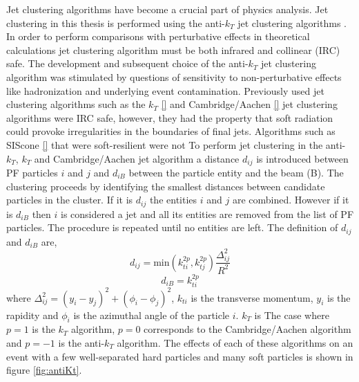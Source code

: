 Jet clustering algorithms have become a crucial part of physics analysis.
Jet clustering in this thesis is performed using 
the anti-$k_{T}$ jet clustering algorithms \cite{Cacciari:2008gp}.
In order to perform %
comparisons with perturbative effects in theoretical calculations jet clustering algorithm
must be both infrared and collinear (IRC) safe. %
The development and subsequent choice of the anti-$k_{T}$ jet clustering algorithm
was stimulated by questions of sensitivity to non-perturbative effects like hadronization
and underlying event contamination. Previously used jet clustering algorithms
such as the $k_{T}$ \ref{} %
and Cambridge/Aachen \ref{} %
jet clustering algorithms were IRC safe, however, they
had the property that soft radiation could provoke irregularities in the boundaries
of final jets. 
Algorithms such as SIScone \ref{} %
that were soft-resilient were not %
To perform jet clustering in the anti-$k_{T}$, $k_{T}$ and Cambridge/Aachen jet algorithm
a distance $d_{ij}$ is introduced between PF particles $i$ and $j$ and $d_{iB}$ between
the particle entity and the beam (B). The clustering proceeds by identifying the smallest distances
between candidate particles in the cluster.
If it is $d_{ij}$ the entities $i$ and $j$ are combined. However if it is $d_{iB}$ then $i$ 
is considered a jet and all its entities are removed from the list of PF particles. The procedure
is repeated until no entities are left. The definition of $d_{ij}$ and $d_{iB}$ are,
\begin{equation}
d_{ij}=\mathrm{min}(k_{ti}^{2p},k_{tj}^{2p})\frac{\Delta^{2}_{ij}}{R^{2}}
\end{equation}
\begin{equation}
d_{iB}=k_{ti}^{2p}
\end{equation}
where $\Delta_{ij}^{2}=(y_{i}-y_{j})^{2}+(\phi_{i}-\phi_{j})^{2}$, $k_{ti}$ is the 
transverse momentum, $y_{i}$ is the rapidity and $\phi_{i}$ is the azimuthal angle of 
the particle $i$. 
$k_{T}$ is %
The case where $p=1$ is the $k_{T}$ algorithm, $p=0$ corresponds to the Cambridge/Aachen
algorithm and $p=-1$ is the anti-$k_{T}$ algorithm.
The effects of each of these algorithms on an event with a few well-separated hard particles
and many soft particles is shown in figure \ref{fig:antiKt}.%

